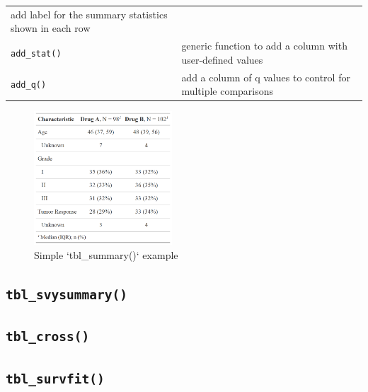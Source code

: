 \documentclass[
]{article}
\begin{document}
\begin{longtable}[]{@{}ll@{}}
\begin{minipage}[t]{0.76\columnwidth}
add label for the summary statistics shown in each row\strut
\end{minipage}\tabularnewline
\begin{minipage}[t]{0.18\columnwidth}\raggedright
\texttt{add\_stat()}\strut
\end{minipage} & \begin{minipage}[t]{0.76\columnwidth}\raggedright
generic function to add a column with user-defined values\strut
\end{minipage}\tabularnewline
\begin{minipage}[t]{0.18\columnwidth}\raggedright
\texttt{add\_q()}\strut
\end{minipage} & \begin{minipage}[t]{0.76\columnwidth}\raggedright
add a column of q values to control for multiple comparisons\strut
\end{minipage}\tabularnewline
\bottomrule
\end{longtable}

\begin{figure}[h!]
  \caption{Simple `tbl\_summary()` example}
  \label{fig:summary_basic}
  \includegraphics[height=5cm]{summary_basic.png}
  \centering
\end{figure}

\hypertarget{tbl_svysummary}{%
\subsection{\texorpdfstring{\texttt{tbl\_svysummary()}}{tbl\_svysummary()}}\label{tbl_svysummary}}

\hypertarget{tbl_cross}{%
\subsection{\texorpdfstring{\texttt{tbl\_cross()}}{tbl\_cross()}}\label{tbl_cross}}

\hypertarget{tbl_survfit}{%
\subsection{\texorpdfstring{\texttt{tbl\_survfit()}}{tbl\_survfit()}}\label{tbl_survfit}}
\end{document}
